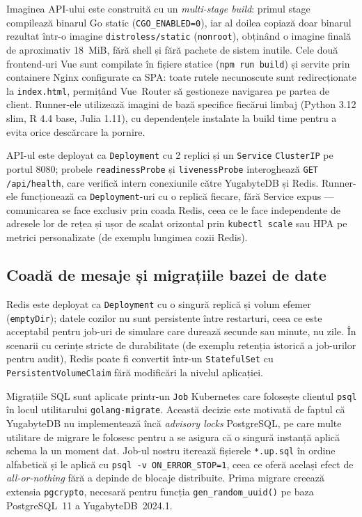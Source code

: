 Imaginea API-ului este construită cu un \emph{multi-stage build}: primul
stage compilează binarul Go static (\texttt{CGO\_ENABLED=0}), iar al doilea
copiază doar binarul rezultat într-o imagine \texttt{distroless/static}
(\texttt{nonroot}), obținând o imagine finală de aproximativ 18~MiB,
fără shell și fără pachete de sistem inutile. Cele două frontend-uri Vue sunt
compilate în fișiere statice (\texttt{npm run build}) și servite prin
containere Nginx configurate ca SPA: toate rutele necunoscute sunt
redirecționate la \texttt{index.html}, permițând Vue~Router să gestioneze
navigarea pe partea de client. Runner-ele utilizează imagini de bază specifice
fiecărui limbaj (Python 3.12 slim, R 4.4 base, Julia 1.11), cu dependențele
instalate la build time pentru a evita orice descărcare la pornire.

API-ul este deployat ca \texttt{Deployment} cu 2 replici și un \texttt{Service}
\texttt{ClusterIP} pe portul 8080; probele \texttt{readinessProbe} și
\texttt{livenessProbe} interoghează \texttt{GET /api/health}, care
verifică intern conexiunile către YugabyteDB și Redis. Runner-ele
funcționează ca \texttt{Deployment}-uri cu o replică fiecare, fără
Service expus --- comunicarea se face exclusiv prin coada Redis, ceea
ce le face independente de adresele lor de rețea și ușor de scalat
orizontal prin \texttt{kubectl scale} sau HPA pe metrici personalizate
(de exemplu lungimea cozii Redis).

\subsection{Coadă de mesaje și migrațiile bazei de date}
\label{subsec:redis_si_migratii}

Redis este deployat ca \texttt{Deployment} cu o singură replică și volum
efemer (\texttt{emptyDir}); datele cozilor nu sunt persistente între
restarturi, ceea ce este acceptabil pentru job-uri de simulare care durează
secunde sau minute, nu zile. În scenarii cu cerințe stricte de durabilitate
(de exemplu retenția istorică a job-urilor pentru audit), Redis poate fi
convertit într-un \texttt{StatefulSet} cu \texttt{PersistentVolumeClaim}
fără modificări la nivelul aplicației.

Migrațiile SQL sunt aplicate printr-un \texttt{Job} Kubernetes care folosește
clientul \texttt{psql} în locul utilitarului \texttt{golang-migrate}.
Această decizie este motivată de faptul că YugabyteDB nu implementează încă
\emph{advisory locks} PostgreSQL, pe care multe utilitare de migrare le
folosesc pentru a se asigura că o singură instanță aplică schema la un
moment dat. Job-ul nostru iterează fișierele \texttt{*.up.sql} în ordine
alfabetică și le aplică cu \texttt{psql -v ON\_ERROR\_STOP=1}, ceea ce
oferă același efect de \emph{all-or-nothing} fără a depinde de blocaje
distribuite. Prima migrare creează extensia \texttt{pgcrypto}, necesară
pentru funcția \texttt{gen\_random\_uuid()} pe baza PostgreSQL~11 a
YugabyteDB~2024.1.

